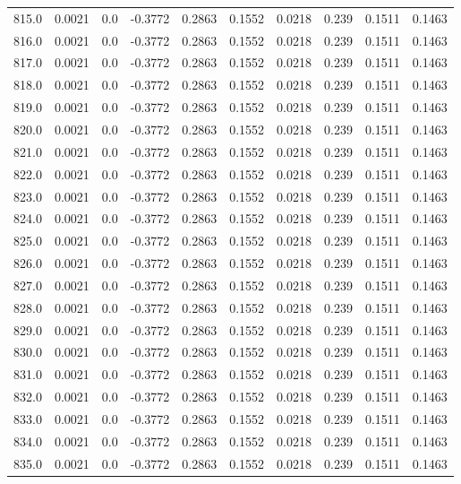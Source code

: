 \begin{longtable}{lrrrrrrrrr}
815.0 & 0.0021 & 0.0 & -0.3772 & 0.2863 & 0.1552 & 0.0218 & 0.239 & 0.1511 & 0.1463 \\
816.0 & 0.0021 & 0.0 & -0.3772 & 0.2863 & 0.1552 & 0.0218 & 0.239 & 0.1511 & 0.1463 \\
817.0 & 0.0021 & 0.0 & -0.3772 & 0.2863 & 0.1552 & 0.0218 & 0.239 & 0.1511 & 0.1463 \\
818.0 & 0.0021 & 0.0 & -0.3772 & 0.2863 & 0.1552 & 0.0218 & 0.239 & 0.1511 & 0.1463 \\
819.0 & 0.0021 & 0.0 & -0.3772 & 0.2863 & 0.1552 & 0.0218 & 0.239 & 0.1511 & 0.1463 \\
820.0 & 0.0021 & 0.0 & -0.3772 & 0.2863 & 0.1552 & 0.0218 & 0.239 & 0.1511 & 0.1463 \\
821.0 & 0.0021 & 0.0 & -0.3772 & 0.2863 & 0.1552 & 0.0218 & 0.239 & 0.1511 & 0.1463 \\
822.0 & 0.0021 & 0.0 & -0.3772 & 0.2863 & 0.1552 & 0.0218 & 0.239 & 0.1511 & 0.1463 \\
823.0 & 0.0021 & 0.0 & -0.3772 & 0.2863 & 0.1552 & 0.0218 & 0.239 & 0.1511 & 0.1463 \\
824.0 & 0.0021 & 0.0 & -0.3772 & 0.2863 & 0.1552 & 0.0218 & 0.239 & 0.1511 & 0.1463 \\
825.0 & 0.0021 & 0.0 & -0.3772 & 0.2863 & 0.1552 & 0.0218 & 0.239 & 0.1511 & 0.1463 \\
826.0 & 0.0021 & 0.0 & -0.3772 & 0.2863 & 0.1552 & 0.0218 & 0.239 & 0.1511 & 0.1463 \\
827.0 & 0.0021 & 0.0 & -0.3772 & 0.2863 & 0.1552 & 0.0218 & 0.239 & 0.1511 & 0.1463 \\
828.0 & 0.0021 & 0.0 & -0.3772 & 0.2863 & 0.1552 & 0.0218 & 0.239 & 0.1511 & 0.1463 \\
829.0 & 0.0021 & 0.0 & -0.3772 & 0.2863 & 0.1552 & 0.0218 & 0.239 & 0.1511 & 0.1463 \\
830.0 & 0.0021 & 0.0 & -0.3772 & 0.2863 & 0.1552 & 0.0218 & 0.239 & 0.1511 & 0.1463 \\
831.0 & 0.0021 & 0.0 & -0.3772 & 0.2863 & 0.1552 & 0.0218 & 0.239 & 0.1511 & 0.1463 \\
832.0 & 0.0021 & 0.0 & -0.3772 & 0.2863 & 0.1552 & 0.0218 & 0.239 & 0.1511 & 0.1463 \\
833.0 & 0.0021 & 0.0 & -0.3772 & 0.2863 & 0.1552 & 0.0218 & 0.239 & 0.1511 & 0.1463 \\
834.0 & 0.0021 & 0.0 & -0.3772 & 0.2863 & 0.1552 & 0.0218 & 0.239 & 0.1511 & 0.1463 \\
835.0 & 0.0021 & 0.0 & -0.3772 & 0.2863 & 0.1552 & 0.0218 & 0.239 & 0.1511 & 0.1463 \\

\end{longtable}
